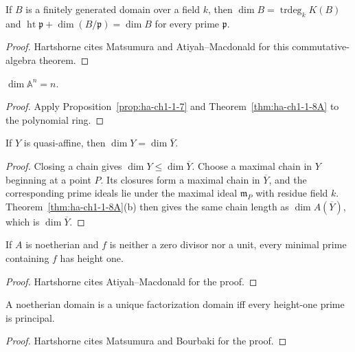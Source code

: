 \begin{theorem}
\label{thm:ha-ch1-1-8A}
If $B$ is a finitely generated domain over a field $k$, then
$\dim B=\operatorname{trdeg}_kK(B)$ and
$\operatorname{ht}\mathfrak p+\dim(B/\mathfrak p)=\dim B$ for every prime $\mathfrak p$.
\end{theorem}
\begin{proof}
Hartshorne cites Matsumura and Atiyah--Macdonald for this commutative-algebra theorem.
\end{proof}

\begin{proposition}
\label{prop:ha-ch1-1-9}
\(\dim\mathbb A^n=n\).
\end{proposition}
\begin{proof}
Apply Proposition~\ref{prop:ha-ch1-1-7} and Theorem~\ref{thm:ha-ch1-1-8A} to the polynomial ring.
\end{proof}

\begin{proposition}
\label{prop:ha-ch1-1-10}
If $Y$ is quasi-affine, then $\dim Y=\dim\overline Y$.
\end{proposition}
\begin{proof}
Closing a chain gives $\dim Y\le\dim\overline Y$.  Choose a maximal chain in $Y$ beginning at a
point $P$.  Its closures form a maximal chain in $\overline Y$, and the corresponding prime
ideals lie under the maximal ideal $\mathfrak m_P$ with residue field $k$.  Theorem~\ref{thm:ha-ch1-1-8A}(b)
then gives the same chain length as $\dim A(\overline Y)$, which is $\dim\overline Y$.
\end{proof}

\begin{theorem}
\label{thm:ha-ch1-1-11A}
If $A$ is noetherian and $f$ is neither a zero divisor nor a unit, every minimal prime containing
$f$ has height one.
\end{theorem}
\begin{proof}
Hartshorne cites Atiyah--Macdonald for the proof.
\end{proof}

\begin{proposition}
\label{prop:ha-ch1-1-12A}
A noetherian domain is a unique factorization domain iff every height-one prime is principal.
\end{proposition}
\begin{proof}
Hartshorne cites Matsumura and Bourbaki for the proof.
\end{proof}

